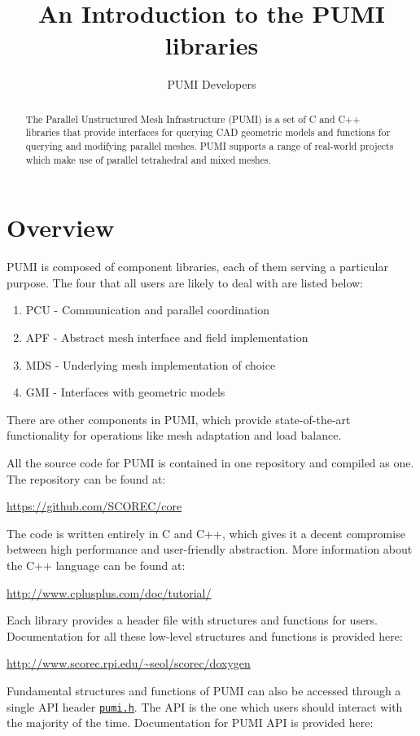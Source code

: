 \documentclass{article}
\author{PUMI Developers}
\title{An Introduction to the PUMI libraries}
\begin{document}
\maketitle

\begin{abstract}
The Parallel Unstructured Mesh Infrastructure (PUMI) is
a set of C and C++ libraries that provide
interfaces for querying CAD  geometric models and functions
for querying and modifying parallel meshes.
PUMI supports a range of real-world projects
which make use of parallel tetrahedral and
mixed meshes.
\end{abstract}

\section{Overview}
PUMI is composed of component libraries, each of
them serving a particular purpose.
The four that all users are likely to deal with
are listed below:

\begin{enumerate}
\item PCU - Communication and parallel coordination
\item APF - Abstract mesh interface and field implementation
\item MDS - Underlying mesh implementation of choice
\item GMI - Interfaces with geometric models
\end{enumerate}

There are other components in PUMI, which provide
state-of-the-art functionality for operations like
mesh adaptation and load balance.

All the source code for PUMI is contained in one
repository and compiled as one.
The repository can be found at:

\url{https://github.com/SCOREC/core}

The code is written entirely in C and C++, which
gives it a decent compromise between high performance
and user-friendly abstraction.
More information about the C++ language can be found at:

\url{http://www.cplusplus.com/doc/tutorial/}

Each library provides a header file with structures
and functions for users. Documentation for all these low-level structures and functions
is provided here:

\url{http://www.scorec.rpi.edu/~seol/scorec/doxygen}

Fundamental structures and functions of PUMI can also be accessed through a single API header \href{https://github.com/SCOREC/core/blob/master/pumi/pumi.h}{\texttt{pumi.h}}. The API  is the one which users should interact with the majority of the time. Documentation for PUMI API is provided here:
\end{document}
